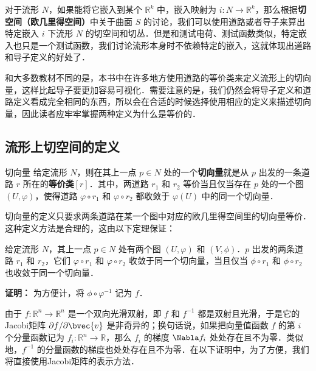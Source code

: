 



对于流形 $N$，如果能将它嵌入到某个 $\mathbb{R}^k$ 中，嵌入映射为 $i:N\rightarrow\mathbb{R}^k$，那么根据\textbf{切空间（欧几里得空间）}中关于曲面 $S$ 的讨论，我们可以使用道路或者导子来算出特定嵌入 $i$ 下流形 $N$ 的切空间和切丛．但是和测试电荷、测试函数类似，特定嵌入也只是一个测试函数，我们讨论流形本身时不依赖特定的嵌入，这就体现出道路和导子定义的好处了．

和大多数教材不同的是，本书中在许多地方使用道路的等价类来定义流形上的切向量，这样比起导子要更加容易可视化．需要注意的是，我们仍然会将导子定义和道路定义看成完全相同的东西，所以会在合适的时候选择使用相应的定义来描述切向量，因此读者应牢牢掌握两种定义为什么是等价的．

\subsection{流形上切空间的定义}

\begin{definition}{切向量}
给定流形 $N$，则在其上一点 $p\in N$ 处的一个\textbf{切向量}就是从 $p$ 出发的一条道路 $r$ 所在的\textbf{等价类}$[r]$．其中，两道路 $r_1$ 和 $r_2$ 等价当且仅当存在 $p$ 处的一个图 $(U, \varphi)$，使得道路 $\varphi\circ r_1$ 和 $\varphi\circ r_2$ 都收敛于 $\varphi(U)$ 中的同一个切向量．
\end{definition}

切向量的定义只要求两条道路在某一个图中对应的欧几里得空间里的切向量等价．这种定义方法是合理的，这由以下定理保证：

\begin{theorem}{}\label{tgSpa_the1}
给定流形 $N$，其上一点 $p\in N$ 处有两个图 $(U, \varphi)$ 和 $(V, \phi)$．$p$ 出发的两条道路 $r_1$ 和 $r_2$，它们 $\varphi\circ r_1$ 和 $\varphi\circ r_2$ 收敛于同一个切向量，当且仅当 $\phi\circ r_1$ 和 $\phi\circ r_2$ 也收敛于同一个切向量．
\end{theorem}

\textbf{证明：}
为方便计，将 $\phi\circ\varphi^{-1}$ 记为 $f$．

由于 $f:\mathbb{R}^n\rightarrow\mathbb{R}^n$ 是一个双向光滑双射，即 $f$ 和 $f^{-1}$ 都是双射且光滑，于是它的Jacobi矩阵 $\partial f/\partial \bvec{v}$ 是非奇异的；换句话说，如果把向量值函数 $f$ 的第 $i$ 个分量函数记为 $f_i:\mathbb{R}^n\rightarrow\mathbb{R}$，那么 $f_i$ 的梯度 $\Nabla f_i$ 处处存在且不为零．类似地，$f^{-1}$ 的分量函数的梯度也处处存在且不为零．在以下证明中，为了方便，我们将直接使用Jacobi矩阵的表示方法．


